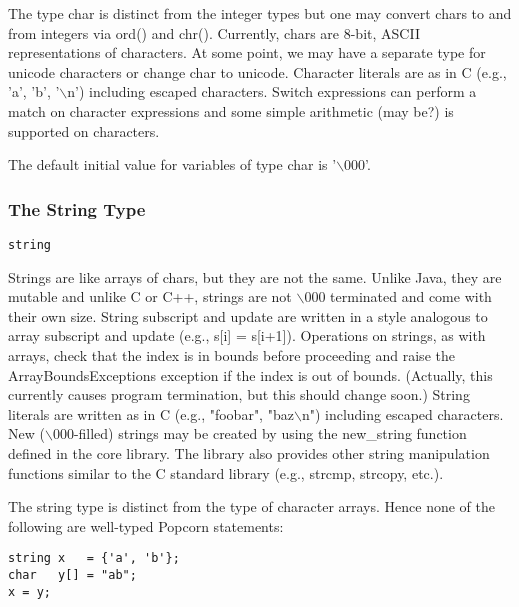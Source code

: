 \documentclass[titlepage,10pt]{article}
\begin{document}
The type char is distinct from the integer types but one may convert
chars to and from integers via ord() and chr().  Currently, chars are
8-bit, ASCII representations of characters.  At some point, we may have
a separate type for unicode characters or change char to unicode.
Character literals are as in C (e.g., 'a', 'b', '$\backslash$n')
including escaped characters.  Switch expressions can perform a match on
character expressions and some simple arithmetic (may be?) is supported
on characters.

The default initial value for variables of type char is
'$\backslash$000'.

\subsubsection{The String Type}


\begin{verbatim}
string
\end{verbatim}

Strings are like arrays of chars, but they are not the same.  Unlike
Java, they are mutable and unlike C or C++, strings are not
$\backslash$000 terminated and come with their own size.   String
subscript and update are written in a style analogous to array subscript
and update (e.g., s[i] = s[i+1]).  Operations on strings, as with
arrays, check that the index is in bounds before proceeding and raise
the ArrayBoundsExceptions exception if the index is out of bounds.
(Actually, this currently causes program termination, but this should
change soon.)  String literals are written as in C (e.g., "foobar",
"baz$\backslash$n") including escaped characters.  New
($\backslash$000-filled) strings may be created by using the
new{\_}string function defined in the core library.  The library also
provides other string manipulation functions similar to the C standard
library (e.g., strcmp, strcopy, etc.).

The string type is distinct from the type of character arrays.  Hence
none of the following are well-typed Popcorn statements: 


\begin{verbatim}
string x   = {'a', 'b'};
char   y[] = "ab";
x = y;
\end{verbatim}
\end{document}
